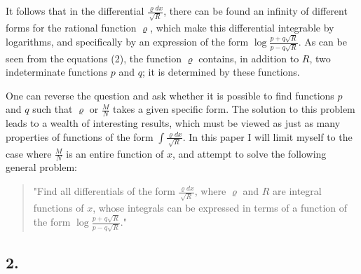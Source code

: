 \documentclass[oneside, 12 pt, leqno]{memoir}
\begin{document}
It follows that in the differential \(\frac{\varrho d x}{\sqrt{R}}\), there can be found an infinity of different forms for the rational function \(\varrho\), which make this differential integrable by logarithms, and specifically by an expression of the form \(\log \frac{p+q \sqrt{R}}{p-q \sqrt{R}}\).  As can be seen from the equations (2), the function \(\varrho\) contains, in addition to \(R\), two indeterminate functions \(p\) and \(q\); it is determined by these functions.

One can reverse the question and ask whether it is possible to find functions \(p\) and \(q\) such that \(\varrho\) or \(\frac{M}{N}\) takes a given specific form. The solution to this problem leads to a wealth of interesting results, which must be viewed as just as many properties of functions of the form \(\int \frac{\varrho d x}{\sqrt{R}}\). In this paper I will limit myself to the case where \(\frac{M}{N}\) is an entire function of \(x\), and attempt to solve the following general problem:

\begin{quote}"Find all differentials of the form \(\frac{\varrho d x}{\sqrt{R}}\), where \(\varrho\) and \(R\) are integral functions of \(x\), whose integrals can be expressed in terms of a function of the form \(\log \frac{p+q \sqrt{R}}{p-q \sqrt{R}}\)." \end{quote}

\subsection*{2.}
\end{document}
